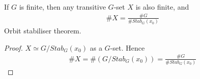 \documentclass[class=scrartcl, crop=false]{standalone}
\begin{document}
\begin{corollary}
  If $G$ is finite, then any transitive $G$-set $X$ is also finite, and  
  \begin{gather*}
    \#X = \frac{\#G}{\#Stab_G(x_0)}
  \end{gather*} 
  Orbit stabiliser theorem.
  \begin{proof}
    $X \simeq G / Stab_G(x_0)$ as a $G$-set. Hence
    \begin{gather*}
      \#X = \#(G / Stab_G(x_0)) = \frac{\#G}{\#Stab_G(x_0)}
    \end{gather*} 
  \end{proof} 
\end{corollary} 
\end{document}
